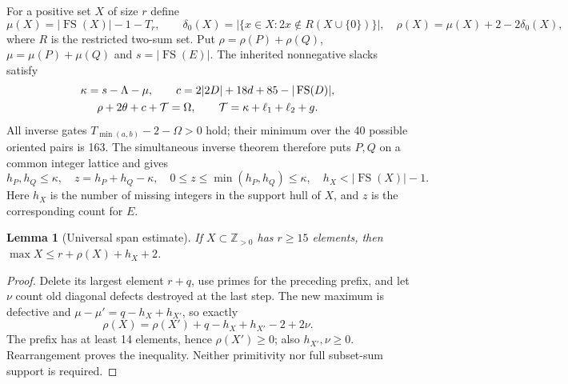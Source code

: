 \documentclass[11pt,a4paper]{article}
\newcommand{\FS}{\operatorname{FS}}
\newcommand{\Z}{\mathbb Z}
\newcommand{\T}{\mathcal T}
\newtheorem{lemma}[theorem]{Lemma}
\begin{document}
For a positive set $X$ of size $r$ define
\[
 \mu(X)=|\FS(X)|-1-T_r,\qquad
 \delta_0(X)=|\{x\in X:2x\notin R(X\cup\{0\})\}|,
 \quad\rho(X)=\mu(X)+2-2\delta_0(X),
\]
where $R$ is the restricted two-sum set. Put
$\rho=\rho(P)+\rho(Q)$, $\mu=\mu(P)+\mu(Q)$ and $s=|\FS(E)|$.
The inherited nonnegative slacks satisfy
\begin{gather}
 \kappa=s-\Lambda-\mu,\qquad
 c=2|2D|+18d+85-|\FS(D)|,\notag\\
 \rho+2\theta+c+\T=\Omega,\qquad
 \T=\kappa+\ell_1+\ell_2+g.\label{eq:budget}
\end{gather}
All inverse gates $T_{\min(a,b)}-2-\Omega>0$ hold; their minimum over
the 40 possible oriented pairs is 163. The simultaneous inverse theorem
therefore puts $P,Q$ on a common integer lattice and gives
\begin{equation}\label{eq:coreholes}
 h_P,h_Q\le\kappa,\quad z=h_P+h_Q-\kappa,
 \quad0\le z\le\min(h_P,h_Q)\le\kappa,
 \quad h_X<|\FS(X)|-1.
\end{equation}
Here $h_X$ is the number of missing integers in the support hull of $X$,
and $z$ is the corresponding count for $E$.

\begin{lemma}[Universal span estimate]\label{lem:span}
If $X\subset\Z_{>0}$ has $r\ge15$ elements, then
$\max X\le r+\rho(X)+h_X+2$.
\end{lemma}
\begin{proof}
Delete its largest element $r+q$, use primes for the preceding prefix,
and let $\nu$ count old diagonal defects destroyed at the last step.
The new maximum is defective and
$\mu-\mu'=q-h_X+h_{X'}$, so exactly
\[
 \rho(X)=\rho(X')+q-h_X+h_{X'}-2+2\nu.
\]
The prefix has at least 14 elements, hence $\rho(X')\ge0$; also
$h_{X'},\nu\ge0$. Rearrangement proves the inequality.
Neither primitivity nor full subset-sum support is required.
\end{proof}
\end{document}

